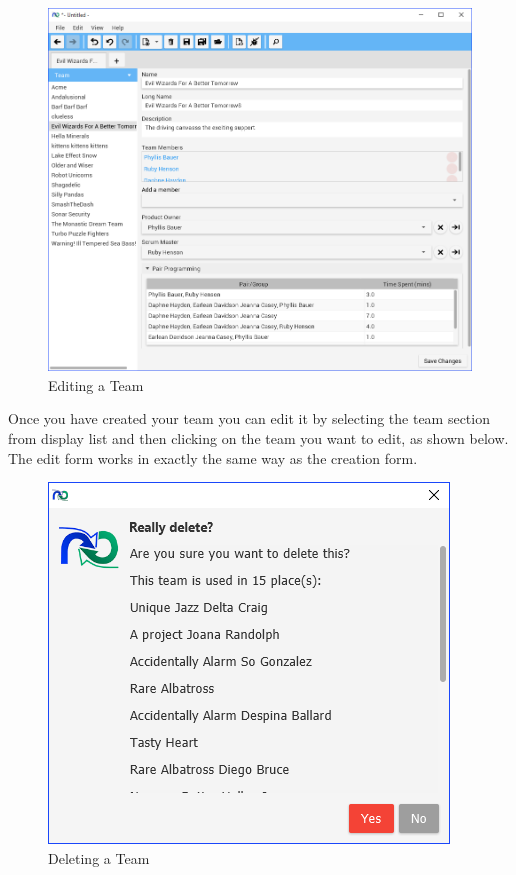 \begin{figure}[h]
	\centering
	\includegraphics[width=\textwidth]{images/screenshots/teams4.PNG}
	\caption{Editing a Team}
	\label{fig:new_project}
\end{figure}

Once you have created your team you can edit it by selecting the team section from display list and then clicking on the team you want to edit, as shown below. The edit form works in exactly the same way as the creation form.

\begin{figure}[h]
	\centering
	\includegraphics[width=\textwidth]{images/screenshots/teams5.PNG}
	\caption{Deleting a Team}
	\label{fig:new_project}
\end{figure}

